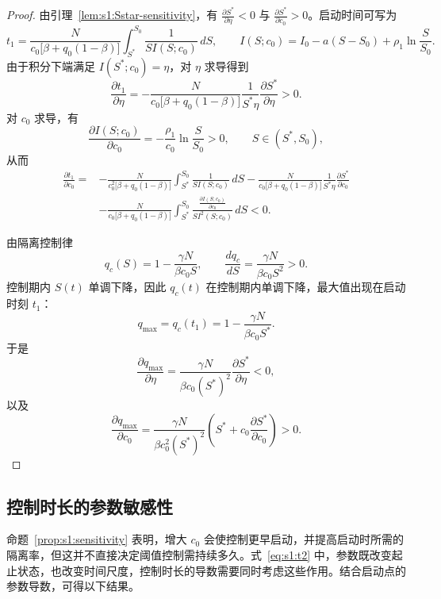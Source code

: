 \documentclass[lang=cn,a4paper,newtx]{elegantpaper}
\numberwithin{equation}{section}
\theoremstyle{plain}
\begin{document}
\begin{proof}
由引理~\ref{lem:s1:Sstar-sensitivity}，有
$\frac{\partial S^*}{\partial \eta}<0$ 与 $\frac{\partial S^*}{\partial c_0}>0$。启动时间可写为
\begin{equation}
t_1
=
\frac{N}{c_0\bigl[\beta+q_0(1-\beta)\bigr]}
\int_{S^*}^{S_0}
\frac{1}{S I(S;c_0)}\,dS,
\qquad
I(S;c_0)
=
I_0-a(S-S_0)+\rho_1\ln\frac{S}{S_0}.
\end{equation}
由于积分下端满足 $I(S^*;c_0)=\eta$，对 $\eta$ 求导得到
\begin{equation}
\frac{\partial t_1}{\partial \eta}
=
-\frac{N}{c_0\bigl[\beta+q_0(1-\beta)\bigr]}
\frac{1}{S^*\eta}
\frac{\partial S^*}{\partial \eta}>0.
\end{equation}
对 $c_0$ 求导，有
\[
\frac{\partial I(S;c_0)}{\partial c_0}
=
-\frac{\rho_1}{c_0}\ln\frac{S}{S_0}>0,
\qquad S\in(S^*,S_0),
\]
从而
\begin{align}
\frac{\partial t_1}{\partial c_0}
=&
-\frac{N}{c_0^2\bigl[\beta+q_0(1-\beta)\bigr]}
\int_{S^*}^{S_0}\frac{1}{S I(S;c_0)}\,dS
-\frac{N}{c_0\bigl[\beta+q_0(1-\beta)\bigr]}
\frac{1}{S^*\eta}
\frac{\partial S^*}{\partial c_0} \nonumber\\
&-\frac{N}{c_0\bigl[\beta+q_0(1-\beta)\bigr]}
\int_{S^*}^{S_0}
\frac{\frac{\partial I(S;c_0)}{\partial c_0}}{S I^2(S;c_0)}\,dS
<0.
\end{align}


由隔离控制律
\[
q_c(S)=1-\frac{\gamma N}{\beta c_0S},
\qquad
\frac{dq_c}{dS}
=
\frac{\gamma N}{\beta c_0S^2}>0.
\]
控制期内 $S(t)$ 单调下降，因此 $q_c(t)$ 在控制期内单调下降，最大值出现在启动时刻 $t_1$：
\[
q_{\max}
=
q_c(t_1)
=
1-\frac{\gamma N}{\beta c_0S^*}.
\]
于是
\[
\frac{\partial q_{\max}}{\partial \eta}
=
\frac{\gamma N}{\beta c_0(S^*)^2}\frac{\partial S^*}{\partial \eta}<0,
\]
以及
\[
\frac{\partial q_{\max}}{\partial c_0}
=
\frac{\gamma N}{\beta c_0^2(S^*)^2}
\left(S^*+c_0\frac{\partial S^*}{\partial c_0}\right)>0.
\]
\end{proof}

\subsection{控制时长的参数敏感性}
命题~\ref{prop:s1:sensitivity} 表明，增大 $c_0$ 会使控制更早启动，并提高启动时所需的隔离率，但这并不直接决定阈值控制需持续多久。式~\eqref{eq:s1:t2} 中，参数既改变起止状态，也改变时间尺度，控制时长的导数需要同时考虑这些作用。结合启动点的参数导数，可得以下结果。
\end{document}

